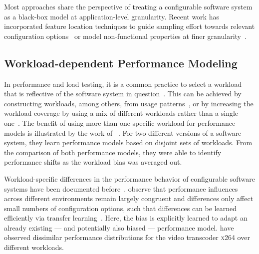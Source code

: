 Most approaches share the perspective of treating a configurable software system as a black-box model at application-level granularity. Recent work has incorporated feature location techniques to guide sampling effort towards relevant configuration options~\cite{velez_2020_configcrusher_jase,velez_comprex_2021} or model non-functional properties at finer granularity~\cite{weber_white_2021}.

\subsection{Workload-dependent Performance Modeling}

In performance and load testing, it is a common practice to select a workload that is reflective of the software system in question~\cite{ceesay2020,papadopoulos2021}. This can be achieved by constructing workloads, among others, from usage patterns~\cite{calzarossa2016}, or by increasing the workload coverage by using a mix of different workloads rather than a single one~\cite{jiang2015survey}.
The benefit of using more than one specific workload for performance models is illustrated by the work of \citeauthor{liao_2020_using_emse}~\cite{liao_2020_using_emse}. For two different versions of a software system, they learn performance models based on disjoint sets of workloads. From the comparison of both performance models, they were able to identify performance shifts as the workload bias was averaged out.

Workload-specific differences in the performance behavior of configurable software systems have been documented before~\cite{jamishidi_transfer_2017,alves_sampling_2020}. \citeauthor{jamishidi_transfer_2017} observe that performance influences across different environments remain largely congruent and differences only affect small numbers of configuration options, such that differences can be learned efficiently via transfer learning~\cite{jamishidi_transfer_2017,jamshidi_learning_2018,jamshidi_transfer_gp_2017,ding_bayesian_2020}. Here, the bias is explicitly learned to adapt an already existing --- and potentially also biased --- performance model. \citeauthor{alves_sampling_2020} have observed dissimilar performance distributions for the video transcoder \textsc{x264} over different  workloads.


